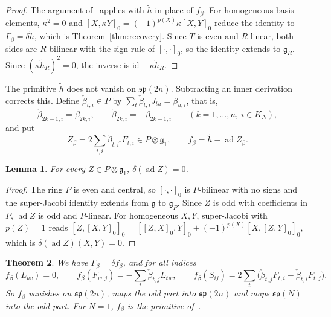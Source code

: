 \documentclass[11pt]{article}
\numberwithin{equation}{section}
\newtheorem{theorem}{Theorem}[section]
\newtheorem{lemma}[theorem]{Lemma}
\theoremstyle{definition}
\theoremstyle{remark}
\newcommand{\ad}{\operatorname{ad}}
\begin{document}
\begin{proof}
The argument of~\cite[Theorem~4.1]{Aoi26} applies with $\tilde h$ in place of $f_\beta$. For
homogeneous basis elements, $\kappa^2=0$ and $[X,\kappa Y]_0=(-1)^{p(X)}\kappa[X,Y]_0$ reduce the
identity to $\Gamma_\beta=\delta\tilde h$, which is Theorem~\ref{thm:recovery}. Since $T$ is even and
$R$-linear, both sides are $R$-bilinear with the sign rule of $[\cdot,\cdot]_0$, so the identity extends to $\mathfrak g_R$. Since $(\kappa\tilde h_R)^2=0$, the inverse is
$\mathrm{id}-\kappa\tilde h_R$.
\end{proof}

The primitive $\tilde h$ does not vanish on $\mathfrak{sp}(2n)$. Subtracting an inner derivation
corrects this. Define $\check\beta_{t,i}\in P$ by $\sum_t\check\beta_{t,i}J_{tu}=\beta_{u,i}$, that is,
\begin{equation}\label{eq:v}
 \check\beta_{2k-1,i}=\beta_{2k,i},\qquad \check\beta_{2k,i}=-\beta_{2k-1,i}\qquad(k=1,\ldots,n,\ i\in K_N),
\end{equation}
and put
\begin{equation}\label{eq:primitive}
 Z_\beta=2\sum_{t,i}\check\beta_{t,i^*}F_{t,i}\in P\otimes\mathfrak g_{\bar1},\qquad
 f_\beta=\tilde h-\ad Z_\beta .
\end{equation}

\begin{lemma}\label{lem:inner}
For every $Z\in P\otimes\mathfrak g_{\bar1}$, $\delta(\ad Z)=0$.
\end{lemma}

\begin{proof}
The ring $P$ is even and central, so $[\cdot,\cdot]_0$ is $P$-bilinear with no signs and the super-Jacobi
identity extends from $\mathfrak g$ to $\mathfrak g_P$. Since $Z$ is odd with coefficients in $P$,
$\ad Z$ is odd and $P$-linear. For homogeneous $X,Y$,
super-Jacobi with $p(Z)=1$ reads
$[Z,[X,Y]_0]_0=[[Z,X]_0,Y]_0+(-1)^{p(X)}[X,[Z,Y]_0]_0$, which is
$\delta(\ad Z)(X,Y)=0$.
\end{proof}

\begin{theorem}\label{thm:fbeta}
We have $\Gamma_\beta=\delta f_\beta$, and for all indices
\[
 f_\beta(L_{uv})=0,\qquad
 f_\beta(F_{w,j})=-\sum_t\check\beta_{t,j}L_{tw},\qquad
 f_\beta(S_{ij})=2\sum_t\bigl(\check\beta_{t,j}F_{t,i}-\check\beta_{t,i}F_{t,j}\bigr).
\]
So $f_\beta$ vanishes on $\mathfrak{sp}(2n)$, maps the odd part into $\mathfrak{sp}(2n)$
and maps $\mathfrak{so}(N)$ into the odd part. For $N=1$, $f_\beta$ is the primitive of~\cite[Theorem~4.1]{Aoi26}.
\end{theorem}
\end{document}

